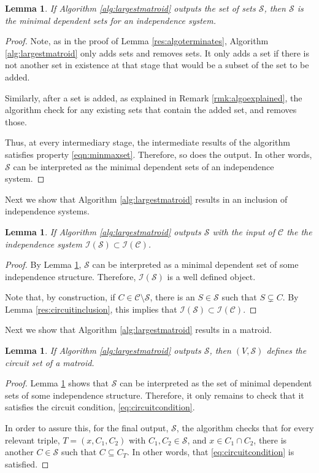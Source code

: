 \documentclass[11pt]{article}
\newcommand{\sI}{\mathscr{I}}
\newcommand{\sC}{\mathscr{C}}
\newcommand{\sS}{\mathscr{S}}
\newtheorem{lem}[thm]{Lemma}
\theoremstyle{remark}
\theoremstyle{definition}
\begin{document}
\begin{lem}\label{res:algogivesminimal}
    If Algorithm \ref{alg:largestmatroid} outputs the set of sets $\sS$, then $\sS$ is the minimal dependent sets for an independence system.
\end{lem}
\begin{proof}
    Note, as in the proof of Lemma \ref{res:algoterminates}, Algorithm \ref{alg:largestmatroid} only adds sets and removes sets. It only adds a set if there is not another set in existence at that stage that would be a subset of the set to be added. 

    Similarly, after a set is added, as explained in Remark \ref{rmk:algoexplained}, the algorithm check for any existing sets that contain the added set, and removes those.

    Thus, at every intermediary stage, the intermediate results of the algorithm satisfies property \eqref{eqn:minmaxset}. Therefore, so does the output. In other words, $\sS$ can be interpreted as the minimal dependent sets of an independence system.
\end{proof}

Next we show that Algorithm \ref{alg:largestmatroid} results in an inclusion of independence systems.

\begin{lem}\label{ref:algogivesinclusion}
    If Algorithm \ref{alg:largestmatroid} outputs $\sS$ with the input of $\sC$ the the independence system $\sI(\sS) \subset \sI(\sC)$.
\end{lem}
\begin{proof}
    By Lemma \ref{res:algogivesminimal}, $\sS$ can be interpreted as a minimal dependent set of some independence structure. Therefore, $\sI(\sS)$ is a well defined object. 

    Note that, by construction, if $C \in \sC \setminus \sS$, there is an $S \in \sS$ such that $S \subsetneq C$.
    By Lemma \ref{res:circuitinclusion}, this implies that $\sI(\sS) \subset \sI(\sC)$. 
\end{proof}

Next we show that Algorithm \ref{alg:largestmatroid} results in a matroid.
\begin{lem} \label{res:algogivesmatroid} If Algorithm \ref{alg:largestmatroid} outputs $\sS$, then $(V, \sS)$ defines the circuit set of a matroid.
\end{lem}
\begin{proof}
    Lemma \ref{res:algogivesminimal} shows that $\sS$ can be interpreted as the set  of minimal dependent sets of some independence structure. Therefore, it only remains to check that it satisfies the circuit condition, \eqref{eq:circuitcondition}.

    In order to assure this, for the final output, $\sS$, the algorithm checks that for every relevant triple, $T = (x, C_1, C_2)$ with $C_1, C_2 \in \sS$, and $x \in C_1 \cap C_2$, there is another $C \in \sS$ such that $C \subseteq C_T$. In other words, that \eqref{eq:circuitcondition} is satisfied.
    \end{proof}
\end{document}
